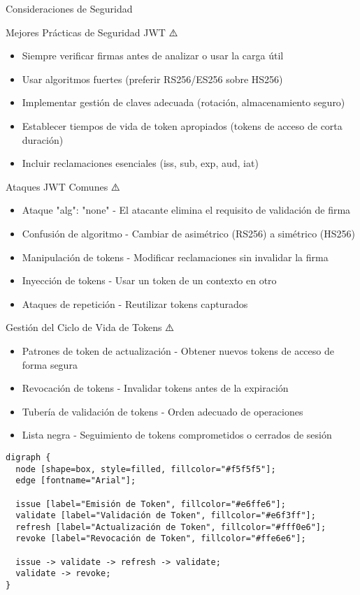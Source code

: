 \documentclass[presentation,aspectratio=169]{beamer}
\begin{document}
\begin{frame}[label={sec:orga1ed9c1},fragile]{Consideraciones de Seguridad}
 \begin{block}{Mejores Prácticas de Seguridad JWT ⚠️}
\begin{itemize}[<+->]
\item \alert{Siempre verificar firmas antes de analizar o usar la carga útil}
\item Usar algoritmos fuertes (preferir RS256/ES256 sobre HS256)
\item Implementar gestión de claves adecuada (rotación, almacenamiento seguro)
\item Establecer tiempos de vida de token apropiados (tokens de acceso de corta duración)
\item Incluir reclamaciones esenciales (iss, sub, exp, aud, iat)
\end{itemize}
\end{block}
\begin{block}{Ataques JWT Comunes ⚠️}
\begin{itemize}[<+->]
\item \alert{Ataque "alg": "none"} - El atacante elimina el requisito de validación de firma
\item \alert{Confusión de algoritmo} - Cambiar de asimétrico (RS256) a simétrico (HS256)
\item \alert{Manipulación de tokens} - Modificar reclamaciones sin invalidar la firma
\item \alert{Inyección de tokens} - Usar un token de un contexto en otro
\item \alert{Ataques de repetición} - Reutilizar tokens capturados
\end{itemize}
\end{block}
\begin{block}{Gestión del Ciclo de Vida de Tokens ⚠️}
\begin{itemize}[<+->]
\item \alert{Patrones de token de actualización} - Obtener nuevos tokens de acceso de forma segura
\item \alert{Revocación de tokens} - Invalidar tokens antes de la expiración
\item \alert{Tubería de validación de tokens} - Orden adecuado de operaciones
\item \alert{Lista negra} - Seguimiento de tokens comprometidos o cerrados de sesión
\end{itemize}

\begin{verbatim}
digraph {
  node [shape=box, style=filled, fillcolor="#f5f5f5"];
  edge [fontname="Arial"];

  issue [label="Emisión de Token", fillcolor="#e6ffe6"];
  validate [label="Validación de Token", fillcolor="#e6f3ff"];
  refresh [label="Actualización de Token", fillcolor="#fff0e6"];
  revoke [label="Revocación de Token", fillcolor="#ffe6e6"];

  issue -> validate -> refresh -> validate;
  validate -> revoke;
}
\end{verbatim}
\end{block}
\end{frame}
\end{document}
